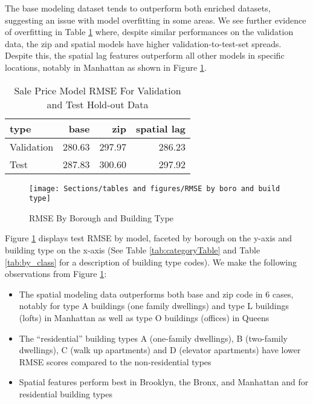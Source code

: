\documentclass[12pt,]{article}
\providecommand{\tightlist}{%
  \setlength{\itemsep}{0pt}\setlength{\parskip}{0pt}}
\begin{document}
The base modeling dataset tends to outperform both enriched datasets,
suggesting an issue with model overfitting in some areas. We see further
evidence of overfitting in Table \ref{tab:SalePriceEval} where, despite
similar performances on the validation data, the zip and spatial models
have higher validation-to-test-set spreads. Despite this, the spatial
lag features outperform all other models in specific locations, notably
in Manhattan as shown in Figure \ref{fig:RMSE by boro and build type}.

\begin{table}

\caption{\label{tab:Sale Price Evaluations}\label{tab:SalePriceEval} Sale Price Model RMSE For Validation and Test Hold-out Data}
\centering
\begin{tabular}[t]{lrrr}
\toprule
type & base & zip & spatial lag\\
\midrule
Validation & 280.63 & 297.97 & 286.23\\
Test & 287.83 & 300.60 & 297.92\\
\bottomrule
\end{tabular}
\end{table}

\begin{figure}[H]
\texttt{[image: Sections/tables and figures/RMSE by boro and build type]} \caption{RMSE By Borough and Building Type}\label{fig:RMSE by boro and build type}
\end{figure}

Figure \ref{fig:RMSE by boro and build type} displays test RMSE by
model, faceted by borough on the y-axis and building type on the x-axis
(See Table \ref{tab:categoryTable} and Table \ref{tab:by_class} for a
description of building type codes). We make the following observations
from Figure \ref{fig:RMSE by boro and build type}:

\begin{itemize}
\tightlist
\item
  The spatial modeling data outperforms both base and zip code in 6
  cases, notably for type A buildings (one family dwellings) and type L
  buildings (lofts) in Manhattan as well as type O buildings (offices)
  in Queens
\item
  The ``residential'' building types A (one-family dwellings), B
  (two-family dwellings), C (walk up apartments) and D (elevator
  apartments) have lower RMSE scores compared to the non-residential
  types
\item
  Spatial features perform best in Brooklyn, the Bronx, and Manhattan
  and for residential building types
\end{itemize}
\end{document}
